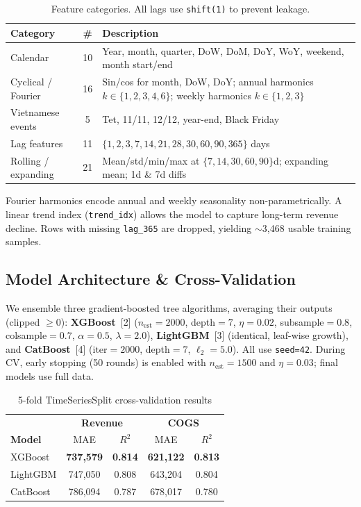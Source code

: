 \documentclass{article}
\begin{document}
\begin{table}[t]
  \caption{Feature categories. All lags use \texttt{shift(1)} to prevent leakage.}
  \label{tab:features}
  \centering
  \small
  \begin{tabular}{lcp{5.8cm}}
    \toprule
    \textbf{Category} & \textbf{\#} & \textbf{Description} \\
    \midrule
    Calendar & 10 & Year, month, quarter, DoW, DoM, DoY, WoY, weekend, month start/end \\
    Cyclical / Fourier & 16 & Sin/cos for month, DoW, DoY; annual harmonics $k\!\in\!\{1,2,3,4,6\}$; weekly harmonics $k\!\in\!\{1,2,3\}$ \\
    Vietnamese events & 5 & Tet, 11/11, 12/12, year-end, Black Friday \\
    Lag features & 11 & $\{1,2,3,7,14,21,28,30,60,90,365\}$ days \\
    Rolling / expanding & 21 & Mean/std/min/max at $\{7,14,30,60,90\}$d; expanding mean; 1d \& 7d diffs \\
    \bottomrule
  \end{tabular}
\end{table}

Fourier harmonics encode annual and weekly seasonality non-parametrically. A linear trend index (\texttt{trend\_idx}) allows the model to capture long-term revenue decline. Rows with missing \texttt{lag\_365} are dropped, yielding $\sim$3,468 usable training samples.

\subsection{Model Architecture \& Cross-Validation}

We ensemble three gradient-boosted tree algorithms, averaging their outputs (clipped $\geq 0$): \textbf{XGBoost}~[2] ($n_\text{est}\!=\!2000$, depth$\!=\!7$, $\eta\!=\!0.02$, subsample$\!=\!0.8$, colsample$\!=\!0.7$, $\alpha\!=\!0.5$, $\lambda\!=\!2.0$), \textbf{LightGBM}~[3] (identical, leaf-wise growth), and \textbf{CatBoost}~[4] ($\text{iter}\!=\!2000$, depth$\!=\!7$, $\ell_2\!=\!5.0$). All use \texttt{seed=42}. During CV, early stopping (50 rounds) is enabled with $n_\text{est}\!=\!1500$ and $\eta\!=\!0.03$; final models use full data.

\begin{table}[t]
  \caption{5-fold TimeSeriesSplit cross-validation results}
  \label{tab:cv}
  \centering
  \small
  \begin{tabular}{lcc|cc}
    \toprule
    & \multicolumn{2}{c|}{\textbf{Revenue}} & \multicolumn{2}{c}{\textbf{COGS}} \\
    \textbf{Model} & MAE & $R^2$ & MAE & $R^2$ \\
    \midrule
    XGBoost  & \textbf{737,579} & \textbf{0.814} & \textbf{621,122} & \textbf{0.813} \\
    LightGBM & 747,050 & 0.808 & 643,204 & 0.804 \\
    CatBoost & 786,094 & 0.787 & 678,017 & 0.780 \\
    \bottomrule
  \end{tabular}
\end{table}
\end{document}
